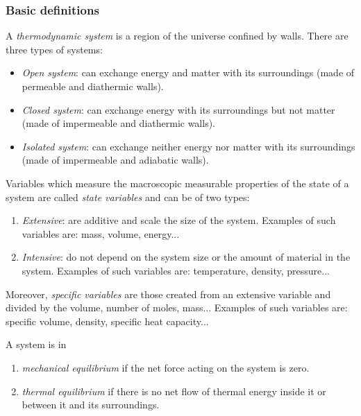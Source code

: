 \documentclass[../../../main.tex]{subfiles}
\begin{document}
\begin{multicols}{2}
    \subsubsection*{Basic definitions}
    \begin{definition}
        A \textit{thermodynamic system} is a region of the universe confined by walls. There are three types of systems:
        \begin{itemize}
            \item \textit{Open system}: can exchange energy and matter with its surroundings (made of permeable and diathermic walls).
            \item \textit{Closed system}: can exchange energy with its surroundings but not matter (made of impermeable and diathermic walls).
            \item \textit{Isolated system}: can exchange neither energy nor matter with its surroundings (made of impermeable and adiabatic walls).
        \end{itemize}
    \end{definition}
    \begin{definition}
        Variables which measure the macroscopic measurable properties of the state of a system are called \textit{state variables} and can be of two types:
        \begin{enumerate}
            \item \textit{Extensive}: are additive and scale the size of the system. Examples of such variables are: mass, volume, energy...
            \item \textit{Intensive}: do not depend on the system size or the amount of material in the system. Examples of such variables are: temperature, density, pressure...
        \end{enumerate}
        Moreover, \textit{specific variables} are those created from an extensive variable and divided by the volume, number of moles, mass... Examples of such variables are: specific volume, density, specific heat capacity...
    \end{definition}
    \begin{definition}
        A system is in
        \begin{enumerate}
            \item \textit{mechanical equilibrium} if the net force acting on the system is zero.
            \item \textit{thermal equilibrium} if there is no net flow of thermal energy inside it or between it and its surroundings.

\end{enumerate}
\end{definition}
\end{multicols}
\end{document}
